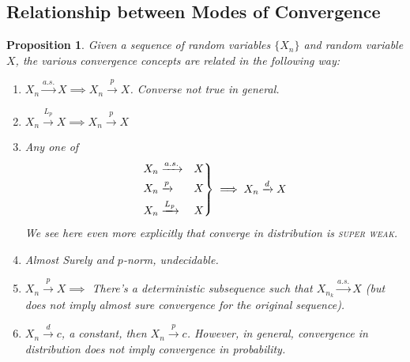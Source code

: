\documentclass[12pt]{article}
\theoremstyle{plain}
\newtheorem{prop}[thm]{Proposition}
\theoremstyle{definition}
\theoremstyle{remark}
\newenvironment{rcases}
  {\left.\begin{aligned}}
  {\end{aligned}\right\rbrace}
\newcommand{\asto}{\xrightarrow{a.s.}}
\newcommand{\pto}{\xrightarrow{p}}
\newcommand{\dto}{\xrightarrow{d}}
\newcommand{\Lpto}{\xrightarrow{L_p}}
\begin{document}
\clearpage
\subsection{Relationship between Modes of Convergence}

\begin{prop}
Given a sequence of random variables $\{X_n\}$ and random variable $X$,
the various convergence concepts are related in the following way:
\begin{enumerate}
  \item $X_n\asto X \implies X_n\pto X$. Converse not true in general.
  \item $X_n\Lpto X \implies X_n\pto X$
  \item Any one of
    \begin{align*}
      \begin{rcases}
        X_n&\asto &X \\
        X_n&\pto &X \\
        X_n&\Lpto &X
      \end{rcases}
      \implies X_n\dto X
    \end{align*}
    We see here even more explicitly that converge in distribution is
    \textsc{super weak}.
  \item Almost Surely and $p$-norm, undecidable.
  \item $X_n\pto X \implies$ There's a deterministic subsequence such
    that $X_{n_k}\asto X$ (but does not imply almost sure convergence
    for the original sequence).

  \item $X_n\dto c$, a constant, then $X_n\pto c$. However, in general,
    convergence in distribution does not imply convergence in
    probability.
\end{enumerate}
\end{prop}
\end{document}
